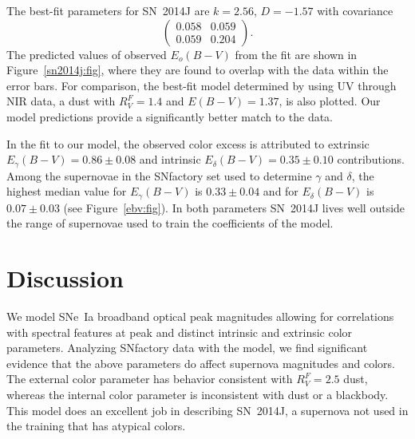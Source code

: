 \documentclass{aastex}   	%
\begin{document}
The best-fit parameters for SN~2014J are $k= 2.56$, $ D=-1.57$ with covariance
\begin{equation}
\begin{pmatrix}
0.058 & 0.059 \\
0.059 & 0.204
\end{pmatrix}.
\end{equation}
The predicted values of observed $E_o(B-V)$ from the fit are shown in Figure~\ref{sn2014j:fig}, where they are found to
overlap with the data within the error bars.   For comparison, the best-fit model determined by  \citet{2014ApJ...788L..21A} using
UV through NIR data,
a  \citet{1999PASP..111...63F} dust with $R_V^F=1.4$ and $E(B-V)=1.37$, 
is also plotted.  Our model predictions provide a significantly better match to the data.

In the fit to our model, the observed color excess is attributed to   extrinsic
$E_\gamma(B-V)=  0.86 \pm   0.08$ and intrinsic $E_\delta(B-V)=  0.35 \pm   0.10$ contributions.
Among the supernovae in the SNfactory  set used to determine $\gamma$ and $\delta$, the highest median value for 
$E_\gamma(B-V)$ is $  0.33 \pm 0.04$ and for $E_\delta(B-V)$ is
$  0.07 \pm 0.03$ 
(see Figure~\ref{ebv:fig}).
In both parameters SN~2014J lives well outside the range of supernovae used to train the coefficients of the model.

\section{Discussion}
\label{discussion:sec}
We model SNe~Ia broadband optical peak magnitudes allowing for correlations with spectral features at peak and distinct intrinsic and
extrinsic color parameters.  Analyzing SNfactory data with the model, we find significant evidence that the above parameters do
affect supernova magnitudes and colors.  The external color parameter has behavior consistent with $R^F_V=2.5$ \citet{1999PASP..111...63F} dust,
whereas the internal color parameter is inconsistent with dust or a blackbody.  This model  does an excellent job in
describing SN~2014J, a supernova not used in the training that has atypical colors.
\end{document}
